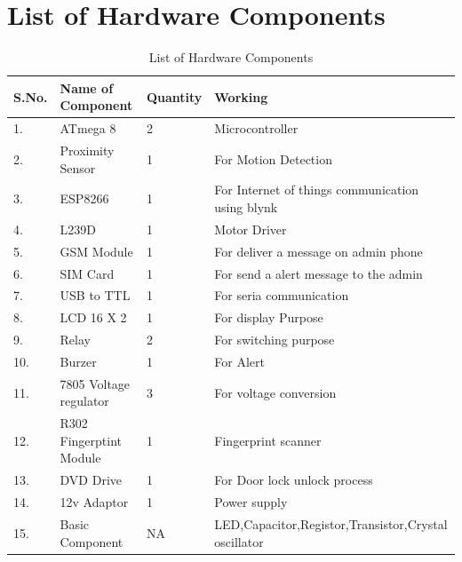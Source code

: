 \documentclass[twoside,a4paper,16pt]{book}
\begin{document}
{{\section{List of Hardware Components}
\begin{center}
	\begin{table}[h!]
		\centering
		\begin{tabular}{|p{1cm}|p{8cm}|p{1cm}|p{6.5cm}|}
			\hline
			{\bf S.No.} & {\bf Name of Component} & {Quantity} & {\bf Working}\\
			\hline	
			1. & ATmega 8 & 2 & Microcontroller\\
			\hline
			2. & Proximity Sensor  & 1 & For Motion Detection\\
			\hline
			3. & ESP8266 & 1 & For Internet of things communication using blynk\\
			\hline
			4. & L239D & 1 & Motor Driver\\
			\hline
			5. & GSM Module & 1 & For deliver a message on admin phone\\
			\hline
			6. & SIM Card & 1 & For send a alert message to the admin\\
			\hline
			7. & USB to TTL & 1 & For seria communication\\
			\hline
			8. & LCD 16 X 2 & 1 & For display Purpose \\
			\hline
			9. & Relay & 2 & For switching purpose \\
			\hline
			10. & Burzer & 1 & For Alert \\
			\hline
			11. & 7805 Voltage regulator & 3 & For voltage conversion \\
			\hline
			12. & R302 Fingerptint Module & 1 & Fingerprint scanner \\
			\hline
			13. & DVD Drive & 1 & For Door lock unlock process\\
			\hline
			14. & 12v Adaptor & 1 & Power supply \\
			\hline
			15. & Basic Component & NA & LED,Capacitor,Registor,Transistor,Crystal oscillator \\
			\hline
		\end{tabular}
		\caption{List of Hardware Components}	
	\end{table}
\end{center}
}}
\end{document}
